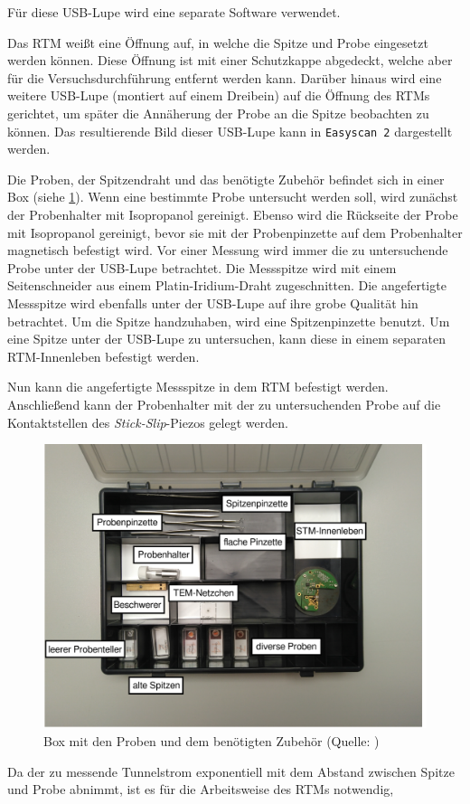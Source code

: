 Für diese USB-Lupe wird eine separate Software verwendet.\par
Das RTM weißt eine Öffnung auf, in welche die Spitze und Probe eingesetzt werden können. Diese Öffnung ist mit einer Schutzkappe abgedeckt, welche aber für
die Versuchsdurchführung entfernt werden kann. Darüber hinaus wird eine weitere USB-Lupe (montiert auf einem Dreibein) auf die Öffnung des RTMs gerichtet,
um später die Annäherung der Probe an die Spitze beobachten zu können. Das resultierende Bild dieser USB-Lupe kann in \texttt{Easyscan 2} dargestellt werden.\par
Die Proben, der Spitzendraht und das benötigte Zubehör befindet sich in einer Box (siehe \cref{fig:koffer}). Wenn eine bestimmte Probe untersucht werden soll,
wird zunächst der Probenhalter mit Isopropanol gereinigt. Ebenso wird die Rückseite der Probe mit Isopropanol gereinigt, bevor sie mit der Probenpinzette
auf dem Probenhalter magnetisch befestigt wird. Vor einer Messung wird immer die zu untersuchende Probe unter der USB-Lupe betrachtet. Die Messspitze wird mit einem
Seitenschneider aus einem Platin-Iridium-Draht zugeschnitten. Die angefertigte Messspitze wird ebenfalls unter der USB-Lupe auf ihre grobe Qualität hin betrachtet.
Um die Spitze handzuhaben, wird eine Spitzenpinzette benutzt. Um eine Spitze unter der USB-Lupe zu untersuchen, kann diese in einem separaten RTM-Innenleben befestigt werden.\par
Nun kann die angefertigte Messspitze in dem RTM befestigt werden. Anschließend kann der Probenhalter mit der zu untersuchenden Probe auf die Kontaktstellen
des \textit{Stick-Slip}-Piezos gelegt werden.
\begin{figure}[H]
	\centering
	\includegraphics[width=0.8\linewidth]{../figs/koffer.png}
	\caption{Box mit den Proben und dem benötigten Zubehör (Quelle: \cite{skript})}
	\label{fig:koffer}
\end{figure} Da der zu messende Tunnelstrom exponentiell mit dem Abstand zwischen Spitze und Probe abnimmt, ist es für die Arbeitsweise des RTMs notwendig,
